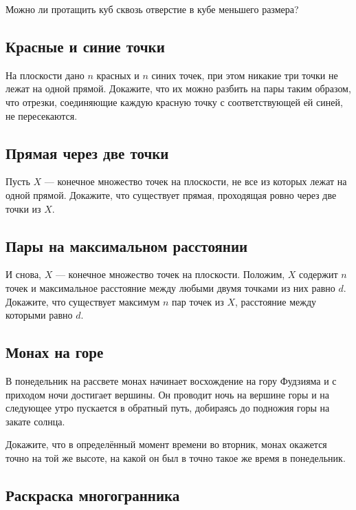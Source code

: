 Можно ли протащить куб сквозь отверстие в кубе меньшего размера?

\subsection*{Красные и синие точки}%

На плоскости дано $n$ красных и $n$ синих точек, при этом никакие три точки не лежат на одной прямой.
Докажите, что их можно разбить на пары таким образом, что отрезки, соединяющие каждую красную точку с соответствующей ей синей, не пересекаются.

\subsection*{Прямая через две точки}%

Пусть $X$ --- конечное множество точек на плоскости, не все из которых лежат на одной прямой.
Докажите, что существует прямая, проходящая ровно через две точки из $X$.

\subsection*{Пары на максимальном расстоянии}%

И снова, $X$ --- конечное множество точек на плоскости.
Положим, $X$ содержит $n$ точек и максимальное расстояние между любыми двумя точками из них равно $d$.
Докажите, что существует максимум $n$ пар точек из $X$, расстояние между которыми равно $d$.

\subsection*{Монах на горе}%

В понедельник на рассвете монах начинает восхождение на гору Фудзияма и с приходом ночи достигает вершины.
Он проводит ночь на вершине горы и на следующее утро пускается в обратный путь, добираясь до подножия горы на закате солнца.

Докажите, что в определённый  момент времени во вторник,  монах окажется точно на той же высоте, на какой  он был в точно такое же время в понедельник.

\subsection*{Раскраска многогранника}%

